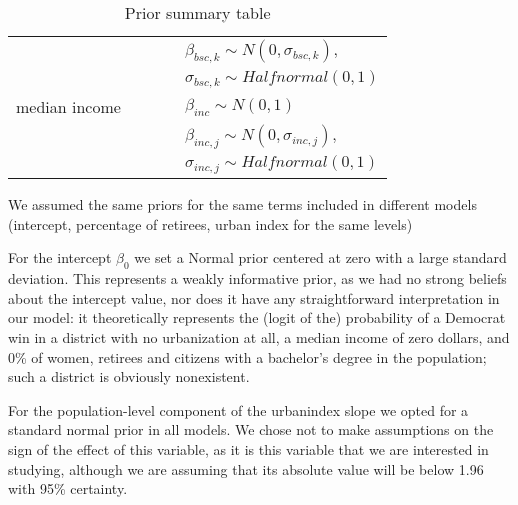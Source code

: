 \documentclass[12pt]{article}
\begin{document}
\begin{table}[h]
{\begin{tabular}{l|llll}
			&                                          &                                          &                                              & $\beta_{bsc, k} \sim N(0, \sigma_{bsc,k}), $ \\
			&                                          &                                          &                                              & $\sigma_{bsc,k} \sim Halfnormal(0,1)$        \\
			median income &                                          &                                          &                                              & $\beta_{inc} \sim N(0,1)$                    \\
			&                                          &                                          &                                              & $\beta_{inc, j} \sim N(0, \sigma_{inc,j}), $ \\
			&                                          &                                          &                                              & $\sigma_{inc,j} \sim Halfnormal(0,1)$        \\ 
			\bottomrule
		\end{tabular}%
	}
	\caption{Prior summary table}
	\label{tab:priors}
\end{table}




We assumed the same priors for the same terms included in different models (intercept, percentage of retirees, urban index for the same levels)




For the intercept $\beta_0$ we set a Normal prior centered at zero with a large standard deviation. 
This represents a weakly informative prior, as we had no strong beliefs about the intercept value, nor does it have any straightforward interpretation in our model: it theoretically represents the (logit of the) probability of a Democrat win in a district with no urbanization at all, a median income of zero dollars, and 0\% of women, retirees and citizens with a bachelor's degree in the population; such a district is obviously nonexistent.


For the population-level component of the urbanindex slope we opted for a standard normal prior in all models. We chose not to make assumptions on the sign of the effect of this variable, as it is this variable that we are interested in studying, although we are assuming that its absolute value will be below 1.96 with 95\% certainty. 
\end{document}
